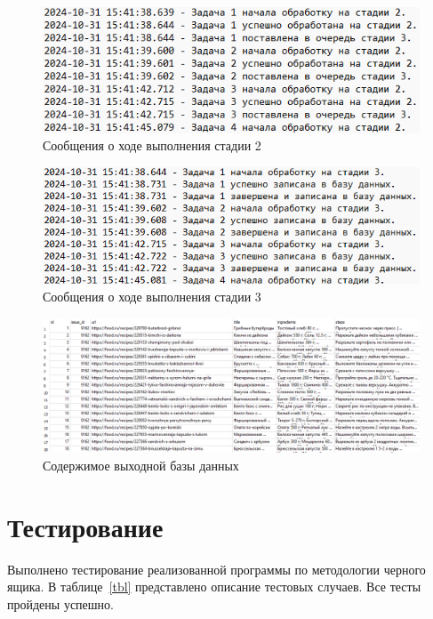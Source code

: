 \begin{figure}[h]
	\centering
	\includegraphics[scale=0.8]{img/5-log2.png}
	\caption{Сообщения о ходе выполнения стадии 2}
	\label{fig:4-prog}
\end{figure}
\begin{figure}[h]
	\centering
	\includegraphics[scale=0.8]{img/6-log3.png}
	\caption{Сообщения о ходе выполнения стадии 3}
	\label{fig:5-prog}
\end{figure}
\begin{figure}[h]
	\centering
	\includegraphics[scale=0.4]{img/2-database.png}
	\caption{Содержимое выходной базы данных}
	\label{fig:6-prog}
\end{figure}

\clearpage

\chapter{Тестирование}

Выполнено тестирование реализованной программы по методологии черного ящика. В таблице~\ref{tbl} представлено описание тестовых случаев. Все тесты пройдены успешно.

